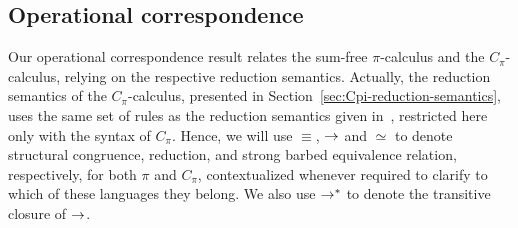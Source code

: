 


%
%

%
%
%
%
%
%
\subsection{Operational correspondence}\label{subsec:Cpi_operational_correspondence}

Our operational correspondence result relates the sum-free $\pi$-calculus and the $C_\pi$-calculus, relying on the respective reduction semantics. 
Actually, the reduction semantics of the $C_\pi$-calculus, presented in Section~\ref{sec:Cpi-reduction-semantics}, uses the same set of rules as the reduction semantics given in~\cite{pi_calculus}, restricted here only with the syntax of $C_\pi$.
Hence, we will use $\equiv$, $\rightarrow$ and $\simeq$ to denote structural congruence, reduction, and strong barbed equivalence relation, respectively, for both $\pi$ and $C_\pi$, contextualized whenever required to clarify to which of these languages they belong. We also use $\rightarrow\negthickspace^*$ to denote the transitive closure of $\rightarrow$. 

